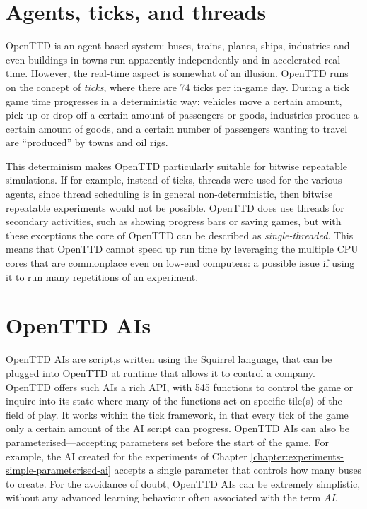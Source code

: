 \documentclass[logo,msc,dsti]{style/infthesis}    %
\begin{document}
{\section{Agents, ticks, and threads}

OpenTTD is an agent-based system: buses, trains, planes, ships, industries and even buildings in towns run apparently independently and in accelerated real time. However, the real-time aspect is somewhat of an illusion. OpenTTD runs on the concept of \emph{ticks}, where there are 74 ticks per in-game day. During a tick game time progresses in a deterministic way: vehicles move a certain amount, pick up or drop off a certain amount of passengers or goods, industries produce a certain amount of goods, and a certain number of passengers wanting to travel are ``produced'' by towns and oil rigs.

This determinism makes OpenTTD particularly suitable for bitwise repeatable simulations. If for example, instead of ticks, threads were used for the various agents, since thread scheduling is in general non-deterministic, then bitwise repeatable experiments would not be possible. OpenTTD does use threads for secondary activities, such as showing progress bars or saving games, but with these exceptions the core of OpenTTD can be described as \emph{single-threaded}. This means that OpenTTD cannot speed up run time by leveraging the multiple CPU cores that are commonplace even on low-end computers: a possible issue if using it to run many repetitions of an experiment.

\section{OpenTTD AIs}

OpenTTD AIs are script,s written using the Squirrel language, that can be plugged into OpenTTD at runtime that allows it to control a company. OpenTTD offers such AIs a rich API, with 545 functions to control the game or inquire into its state \cite{OpenTTDAIAPIDocs} where many of the functions act on specific tile(s) of the field of play. It works within the tick framework, in that every tick of the game only a certain amount of the AI script can progress. OpenTTD AIs can also be parameterised---accepting parameters set before the start of the game. For example, the AI created for the experiments of Chapter \ref{chapter:experiments-simple-parameterised-ai} accepts a single parameter that controls how many buses to create. For the avoidance of doubt, OpenTTD AIs can be extremely simplistic, without any advanced learning behaviour often associated with the term \emph{AI}.

}
\end{document}
